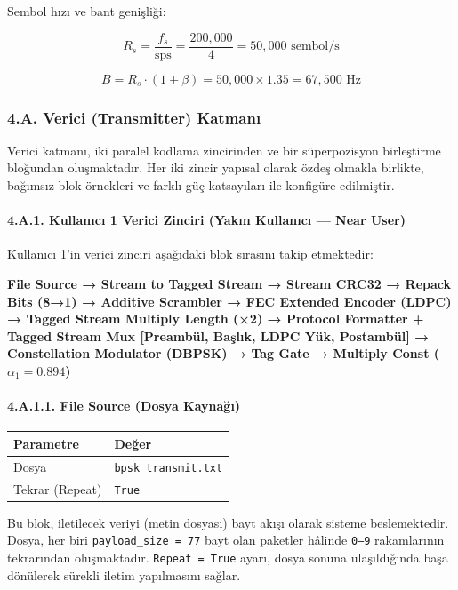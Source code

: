 \documentclass[
]{IEEEtran}
\newcounter{none} %
\begin{document}
Sembol hızı ve bant genişliği:

\[R_s = \frac{f_s}{\text{sps}} = \frac{200{,}000}{4} = 50{,}000 \text{ sembol/s}\]

\[B = R_s \cdot (1 + \beta) = 50{,}000 \times 1.35 = 67{,}500 \text{ Hz}\]

\subsubsection{4.A. Verici (Transmitter)
Katmanı}\label{a.-verici-transmitter-katmanux131}

Verici katmanı, iki paralel kodlama zincirinden ve bir süperpozisyon
birleştirme bloğundan oluşmaktadır. Her iki zincir yapısal olarak özdeş
olmakla birlikte, bağımsız blok örnekleri ve farklı güç katsayıları ile
konfigüre edilmiştir.

\paragraph{4.A.1. Kullanıcı 1 Verici Zinciri (Yakın Kullanıcı --- Near
User)}\label{a.1.-kullanux131cux131-1-verici-zinciri-yakux131n-kullanux131cux131-near-user}

Kullanıcı 1'in verici zinciri aşağıdaki blok sırasını takip etmektedir:

\textbf{File Source → Stream to Tagged Stream → Stream CRC32 → Repack
Bits (8→1) → Additive Scrambler → FEC Extended Encoder (LDPC) → Tagged
Stream Multiply Length (×2) → Protocol Formatter + Tagged Stream Mux
{[}Preambül, Başlık, LDPC Yük, Postambül{]} → Constellation Modulator
(DBPSK) → Tag Gate → Multiply Const (\(\alpha_1 = 0.894\))}

\paragraph{4.A.1.1. File Source (Dosya
Kaynağı)}\label{a.1.1.-file-source-dosya-kaynaux11fux131}

{\def\LTcaptype{none} %
\begin{longtable}[]{@{}ll@{}}
\toprule\noalign{}
Parametre & Değer \\
\midrule\noalign{}
\endhead
\bottomrule\noalign{}
\endlastfoot
Dosya & \texttt{bpsk\_transmit.txt} \\
Tekrar (Repeat) & \texttt{True} \\
\end{longtable}
}

Bu blok, iletilecek veriyi (metin dosyası) bayt akışı olarak sisteme
beslemektedir. Dosya, her biri \texttt{payload\_size\ =\ 77} bayt olan
paketler hâlinde \texttt{0–9} rakamlarının tekrarından oluşmaktadır.
\texttt{Repeat\ =\ True} ayarı, dosya sonuna ulaşıldığında başa
dönülerek sürekli iletim yapılmasını sağlar.
\end{document}
